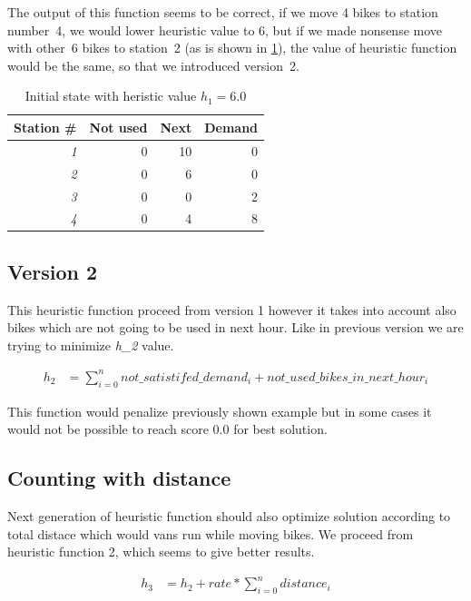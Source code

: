 \documentclass[11pt,twoside,a4paper]{mr}%
\begin{document}
The output of this function seems to be correct, if we move 4 bikes to station number~4, we would lower heuristic value to 6, but if we made nonsense move with other~6 bikes to station~2 (as is shown in \ref{t:ex1b}), the value of heuristic function would be the same, so that we introduced version~2.

 \begin{table}[!t]
\renewcommand{\arraystretch}{1.1}

\label{t:ex1b}
\begin{center}
\begin{tabular}[t]{|r|r|r|r|}
\hline
\bf Station \# & \bf Not used & \bf Next &\bf Demand\\ \hline\hline
\sl1 & 0 & 10 & 0\\ \hline
\sl2 & 0 & 6 & 0\\ \hline
\sl3 & 0 & 0 & 2\\ \hline
\sl4 & 0 & 4 & 8\\ \hline
\end{tabular}
\end{center}
\caption{Initial state with heristic value \(h_1= 6.0\)}
\end{table}

\subsection*{Version 2}
This heuristic function proceed from version 1 however it takes into account also bikes which are not going to be used in next hour. Like in previous version we are trying to minimize \textsl{h\_2} value.

\begin{align}
 h_2 &=\sum\limits_{i=0}^{n} not\_satistifed\_demand_i + not\_used\_bikes\_in\_next\_hour_i
\end{align}

This function would penalize previously shown example but in some cases it would not be possible to reach score 0.0 for best solution.

\subsection*{Counting with distance}
Next generation of heuristic function should also optimize solution according to total distace which would vans run while moving bikes.
We proceed from heuristic function 2, which seems to give better results.

\begin{align}
 h_3 &= h_2 + rate * \sum\limits_{i=0}^{n} distance_i
\end{align}
\end{document}
